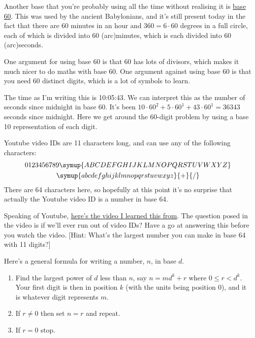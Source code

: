 \documentclass[fleqn]{LectureClass/LectureClass}
\begin{document}
    \begin{app}{}{}
        Another base that you're probably using all the time without realising it is \href{https://en.wikipedia.org/wiki/Sexagesimal}{base 60}.
        This was used by the ancient Babylonians, and it's still present today in the fact that there are 60 minutes in an hour and \(360 = 6 \cdot 60\) degrees in a full circle, each of which is divided into 60 (arc)minutes, which is each divided into 60 (arc)seconds.
        
        One argument for using base 60 is that 60 has lots of divisors, which makes it much nicer to do maths with base 60.
        One argument against using base 60 is that you need 60 distinct digits, which is a lot of symbols to learn.
        
        The time as I'm writing this is 10:05:43.
        We can interpret this as the number of seconds since midnight in base 60.
        It's been \(10 \cdot 60^2 + 5 \cdot 60^1 + 43 \cdot 60^1 = 36343\) seconds since midnight.
        Here we get around the 60-digit problem by using a base 10 representation of each digit.
    \end{app}
    
    \begin{app}{}{}
        Youtube video IDs are 11 characters long, and can use any of the following characters:
        \begin{multline}
            0123456789\symup{ABCDEFGHIJKLMNOPQRSTUVWXYZ}\\
            \symup{abcdefghijklmnopqrstuvwxyz}{+}{/}
        \end{multline}
        There are 64 characters here, so hopefully at this point it's no surprise that actually the Youtube video ID is a number in base 64.
        
        Speaking of Youtube, \href{https://www.youtube.com/watch?v=gocwRvLhDf8}{here's the video I learned this from}.
        The question posed in the video is if we'll ever run out of video IDs?
        Have a go at answering this before you watch the video.
        [Hint: What's the largest number you can make in base 64 with 11 digits?]
    \end{app}
    
    Here's a general formula for writing a number, \(n\), in base \(d\).
    \begin{enumerate}
        \item Find the largest power of \(d\) less than \(n\), say \(n = m d^k + r\) where \(0 \le r < d^k\).
        Your first digit is then in position \(k\) (with the units being position \(0\)), and it is whatever digit represents \(m\).
        \item If \(r \ne 0\) then set \(n = r\) and repeat.
        \item If \(r = 0\) stop.
    \end{enumerate}
    
\end{document}
